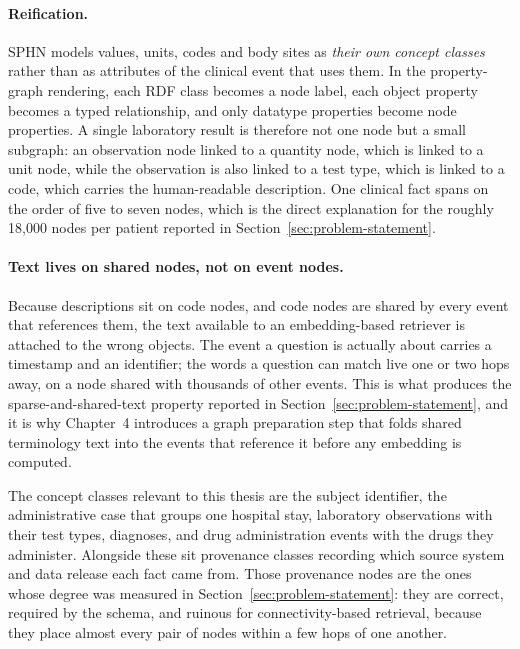 \paragraph{Reification.} SPHN models values, units, codes and body sites as
\emph{their own concept classes} rather than as attributes of the clinical event
that uses them. In the property-graph rendering, each RDF class becomes a node
label, each object property becomes a typed relationship, and only datatype
properties become node properties. A single laboratory result is therefore not
one node but a small subgraph: an observation node linked to a quantity node,
which is linked to a unit node, while the observation is also linked to a test
type, which is linked to a code, which carries the human-readable description.
One clinical fact spans on the order of five to seven nodes, which is the direct
explanation for the roughly 18{,}000 nodes per patient reported in
Section~\ref{sec:problem-statement}.

\paragraph{Text lives on shared nodes, not on event nodes.} Because descriptions
sit on code nodes, and code nodes are shared by every event that references them,
the text available to an embedding-based retriever is attached to the wrong
objects. The event a question is actually about carries a timestamp and an
identifier; the words a question can match live one or two hops away, on a node
shared with thousands of other events. This is what produces the
sparse-and-shared-text property reported in
Section~\ref{sec:problem-statement}, and it is why Chapter~4 introduces a graph
preparation step that folds shared terminology text into the events that
reference it before any embedding is computed.

The concept classes relevant to this thesis are the subject identifier, the
administrative case that groups one hospital stay, laboratory observations with
their test types, diagnoses, and drug administration events with the drugs they
administer. Alongside these sit provenance classes recording which source system
and data release each fact came from. Those provenance nodes are the ones whose
degree was measured in Section~\ref{sec:problem-statement}: they are correct,
required by the schema, and ruinous for connectivity-based retrieval, because they
place almost every pair of nodes within a few hops of one another.

